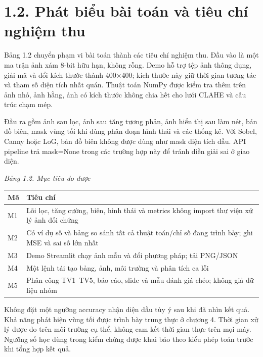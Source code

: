 \documentclass[13pt,a4paper]{extreport}
\begin{document}
\section*{1.2. Phát biểu bài toán và tiêu chí nghiệm thu}
Bảng 1.2 chuyển phạm vi bài toán thành các tiêu chí nghiệm thu. Đầu vào là một ma trận ảnh xám 8-bit hữu hạn, không rỗng. Demo hỗ trợ tệp ảnh thông dụng, giải mã và đổi kích thước thành 400×400; kích thước này giữ thời gian tương tác và tham số diện tích nhất quán. Thuật toán NumPy được kiểm tra thêm trên ảnh nhỏ, ảnh hằng, ảnh có kích thước không chia hết cho lưới CLAHE và cấu trúc chạm mép.
\par
Đầu ra gồm ảnh sau lọc, ảnh sau tăng tương phản, ảnh hiển thị sau làm nét, bản đồ biên, mask vùng tối khi dùng phân đoạn hình thái và các thống kê. Với Sobel, Canny hoặc LoG, bản đồ biên không được dùng như mask diện tích dầu. API pipeline trả mask=None trong các trường hợp này để tránh diễn giải sai ở giao diện.
\par
\noindent\textit{Bảng 1.2. Mục tiêu đo được}
\begin{longtable}{p{7.3cm}|p{7.3cm}}
Mã & Tiêu chí\\\hline
M1 & Lõi lọc, tăng cường, biên, hình thái và metrics không import thư viện xử lý ảnh đối chứng\\\hline
M2 & Có ví dụ số và bảng so sánh tất cả thuật toán/chỉ số đang trình bày; ghi MSE và sai số lớn nhất\\\hline
M3 & Demo Streamlit chạy ảnh mẫu và đổi phương pháp; tải PNG/JSON\\\hline
M4 & Một lệnh tái tạo bảng, ảnh, môi trường và phân tích ca lỗi\\\hline
M5 & Phân công TV1–TV5, báo cáo, slide và mẫu đánh giá chéo; không giả dữ liệu nhóm\\\hline
\end{longtable}
Không đặt một ngưỡng accuracy nhận diện dầu tùy ý sau khi đã nhìn kết quả. Khả năng phát hiện vùng tối được trình bày trung thực ở chương 4. Thời gian xử lý được đo trên môi trường cụ thể, không cam kết thời gian thực trên mọi máy. Ngưỡng số học dùng trong kiểm chứng được khai báo theo kiểu phép toán trước khi tổng hợp kết quả.
\par
\clearpage
\end{document}
